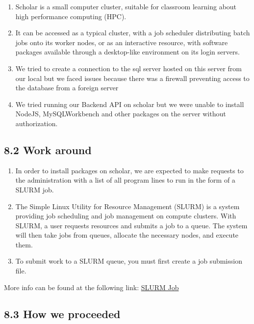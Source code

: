 \documentclass[]{book}
\providecommand{\tightlist}{%
  \setlength{\itemsep}{0pt}\setlength{\parskip}{0pt}}
\begin{document}
\begin{enumerate}
\def\labelenumi{\arabic{enumi}.}
\tightlist
\item
  Scholar is a small computer cluster, suitable for classroom learning about high performance computing (HPC).
\item
  It can be accessed as a typical cluster, with a job scheduler distributing batch jobs onto its worker nodes, or as an interactive resource, with software packages available through a desktop-like environment on its login servers.
\item
  We tried to create a connection to the sql server hosted on this server from our local but we faced issues because there was a firewall preventing access to the database from a foreign server
\item
  We tried running our Backend API on scholar but we were unable to install NodeJS, MySQLWorkbench and other packages on the server without authorization.
\end{enumerate}

\hypertarget{work-around}{%
\subsection{8.2 Work around}\label{work-around}}

\begin{enumerate}
\def\labelenumi{\arabic{enumi}.}
\item
  In order to install packages on scholar, we are expected to make requests to the administration with a list of all program lines to run in the form of a SLURM job.
\item
  The Simple Linux Utility for Resource Management (SLURM) is a system providing job scheduling and job management on compute clusters. With SLURM, a user requests resources and submits a job to a queue. The system will then take jobs from queues, allocate the necessary nodes, and execute them.
\item
  To submit work to a SLURM queue, you must first create a job submission file.
\end{enumerate}

More info can be found at the following link: \href{https://www.rcac.purdue.edu/knowledge/weber/run/slurm}{SLURM Job}

\hypertarget{how-we-proceeded}{%
\subsection{8.3 How we proceeded}\label{how-we-proceeded}}
\end{document}
